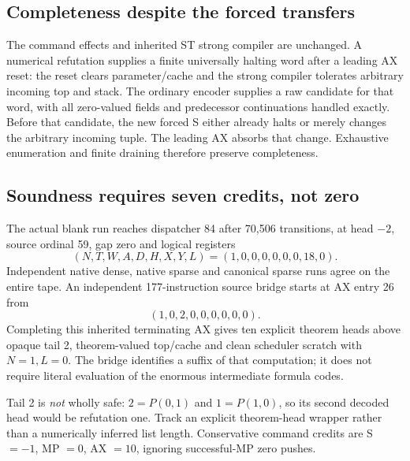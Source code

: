 \documentclass[11pt]{article}
\begin{document}
\subsection*{Completeness despite the forced transfers}
The command effects and inherited ST strong compiler are unchanged. A numerical refutation supplies a finite universally halting word after a leading AX reset: the reset clears parameter/cache and the strong compiler tolerates arbitrary incoming top and stack. The ordinary encoder supplies a raw candidate for that word, with all zero-valued fields and predecessor continuations handled exactly. Before that candidate, the new forced S either already halts or merely changes the arbitrary incoming tuple. The leading AX absorbs that change. Exhaustive enumeration and finite draining therefore preserve completeness.

\subsection*{Soundness requires seven credits, not zero}
The actual blank run reaches dispatcher 84 after 70,506 transitions, at head $-2$, source ordinal 59, gap zero and logical registers
\[
 (N,T,W,A,D,H,X,Y,L)=(1,0,0,0,0,0,0,18,0).
\]
Independent native dense, native sparse and canonical sparse runs agree on the entire tape. An independent 177-instruction source bridge starts at AX entry 26 from
\[
 (1,0,2,0,0,0,0,0,0).
\]
Completing this inherited terminating AX gives ten explicit theorem heads above opaque tail 2, theorem-valued top/cache and clean scheduler scratch with $N=1,L=0$. The bridge identifies a suffix of that computation; it does not require literal evaluation of the enormous intermediate formula codes.

Tail 2 is \emph{not} wholly safe: $2=P(0,1)$ and $1=P(1,0)$, so its second decoded head would be refutation one. Track an explicit theorem-head wrapper rather than a numerically inferred list length. Conservative command credits are S $=-1$, MP $=0$, AX $=10$, ignoring successful-MP zero pushes.
\end{document}
